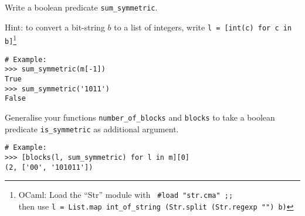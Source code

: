 \documentclass[arhiv]{../izpit}
\begin{document}
\podnaloga
Write a boolean predicate \verb|sum_symmetric|.

Hint: to convert a bit-string $b$ to a list of integers, write \verb|l = [int(c) for c in b]|\footnote{OCaml: Load the ``Str'' module with \verb| #load "str.cma" ;; |\\ then use \verb|l = List.map int_of_string (Str.split (Str.regexp "") b)|}

\begin{verbatim}
# Example:
>>> sum_symmetric(m[-1])
True
>>> sum_symmetric('1011')
False
\end{verbatim}

\podnaloga
Generalise your functions \verb|number_of_blocks| and \verb|blocks| to take a boolean predicate \verb|is_symmetric| as additional argument.

\begin{verbatim}
# Example:
>>> [blocks(l, sum_symmetric) for l in m][0]
(2, ['00', '101011'])
\end{verbatim}
\end{document}
